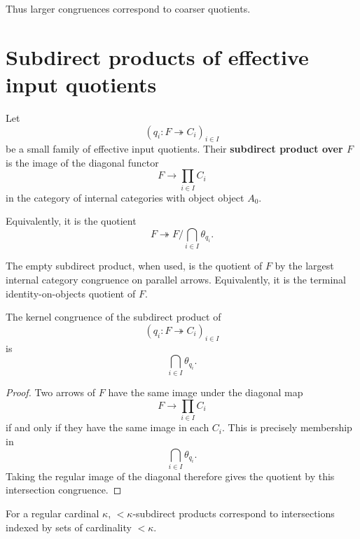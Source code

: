 Thus larger congruences correspond to coarser quotients.

\section{Subdirect products of effective input quotients}
\label{sec:reiterman-subdirect-products-input-quotients}

\begin{definition}
\label{def:reiterman-subdirect-product-input-quotients}
Let
\[
(q_i:F\twoheadrightarrow C_i)_{i\in I}
\]
be a small family of effective input quotients. Their \textbf{subdirect
product over \(F\)} is the image of the diagonal functor
\[
F\longrightarrow
\prod_{i\in I} C_i
\]
in the category of internal categories with object object \(A_0\).

Equivalently, it is the quotient
\[
F\twoheadrightarrow
F/\bigcap_{i\in I}\theta_{q_i}.
\]
\end{definition}

\begin{remark}
\label{rem:reiterman-empty-subdirect-product}
The empty subdirect product, when used, is the quotient of \(F\) by the
largest internal category congruence on parallel arrows. Equivalently, it is
the terminal identity-on-objects quotient of \(F\).
\end{remark}

\begin{proposition}
\label{prop:reiterman-kernel-subdirect-product}
The kernel congruence of the subdirect product of
\[
(q_i:F\twoheadrightarrow C_i)_{i\in I}
\]
is
\[
\bigcap_{i\in I}\theta_{q_i}.
\]
\end{proposition}

\begin{proof}
Two arrows of \(F\) have the same image under the diagonal map
\[
F\to\prod_{i\in I}C_i
\]
if and only if they have the same image in each \(C_i\). This is precisely
membership in
\[
\bigcap_{i\in I}\theta_{q_i}.
\]
Taking the regular image of the diagonal therefore gives the quotient by this
intersection congruence.
\end{proof}

\begin{remark}
\label{rem:reiterman-small-subdirect-products}
For a regular cardinal \(\kappa\), \(<\kappa\)-subdirect products correspond
to intersections indexed by sets of cardinality \(<\kappa\).
\end{remark}


